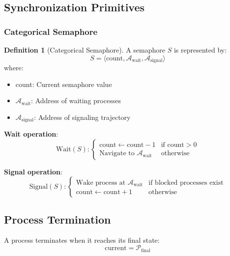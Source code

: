 \documentclass[twocolumn,10pt]{article}
\theoremstyle{definition}
\newtheorem{definition}[theorem]{Definition}
\theoremstyle{remark}
\newcommand{\cataddr}{\mathcal{A}}
\newcommand{\finalstate}{\mathcal{P}_{\text{final}}}
\begin{document}
\subsection{Synchronization Primitives}

\subsubsection{Categorical Semaphore}

\begin{definition}[Categorical Semaphore]
A semaphore $S$ is represented by:
\begin{equation}
    S = \langle \text{count}, \cataddr_{\text{wait}}, \cataddr_{\text{signal}} \rangle
\end{equation}
where:
\begin{itemize}
    \item count: Current semaphore value
    \item $\cataddr_{\text{wait}}$: Address of waiting processes
    \item $\cataddr_{\text{signal}}$: Address of signaling trajectory
\end{itemize}
\end{definition}

\textbf{Wait operation}:
\begin{equation}
    \text{Wait}(S): \begin{cases}
        \text{count} \gets \text{count} - 1 & \text{if count} > 0 \\
        \text{Navigate to } \cataddr_{\text{wait}} & \text{otherwise}
    \end{cases}
\end{equation}

\textbf{Signal operation}:
\begin{equation}
    \text{Signal}(S): \begin{cases}
        \text{Wake process at } \cataddr_{\text{wait}} & \text{if blocked processes exist} \\
        \text{count} \gets \text{count} + 1 & \text{otherwise}
    \end{cases}
\end{equation}

\subsection{Process Termination}

A process terminates when it reaches its final state:
\begin{equation}
    \text{current} = \finalstate
\end{equation}
\end{document}
